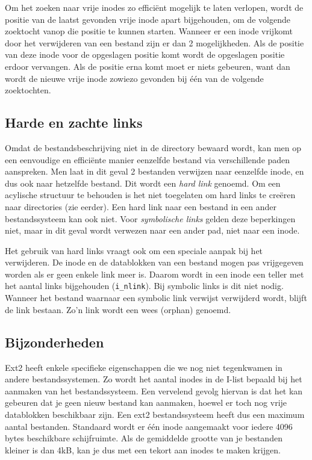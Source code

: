 Om het zoeken naar vrije inodes zo effici\"ent mogelijk te laten verlopen, wordt de positie van de laatst gevonden
vrije inode apart bijgehouden, om de volgende zoektocht vanop die positie te kunnen starten. Wanneer er een inode
vrijkomt door het verwijderen van een bestand zijn er dan 2 mogelijkheden. Als de positie van deze inode voor de
opgeslagen positie komt wordt de opgeslagen positie erdoor vervangen. Als de positie erna komt moet er niets gebeuren,
want dan wordt de nieuwe vrije inode zowiezo gevonden bij \'e\'en van de volgende zoektochten.

\subsection{Harde en zachte links}

Omdat de bestandsbeschrijving niet in de directory bewaard wordt, kan men op een eenvoudige en effici\"ente
manier eenzelfde bestand via verschillende paden aanspreken. Men laat in dit geval 2 bestanden verwijzen
naar eenzelfde inode, en dus ook naar hetzelfde bestand. Dit wordt een \emph{hard link} genoemd. Om een
acylische structuur te behouden is het niet toegelaten om hard links te cre\"eren naar directories
(zie eerder). Een hard link naar een bestand in een ander bestandssysteem kan ook niet. Voor
\emph{symbolische links} gelden deze beperkingen niet, maar in dit geval wordt verwezen naar een ander pad,
niet naar een inode.

Het gebruik van hard links vraagt ook om een speciale aanpak bij het verwijderen. De inode en de datablokken van
een bestand mogen pas vrijgegeven worden als er geen enkele link meer is. Daarom wordt in een inode een teller
met het aantal links bijgehouden (\verb|i_nlink|). Bij symbolic links is dit niet nodig. Wanneer het bestand
waarnaar een symbolic link verwijst verwijderd wordt, blijft de link bestaan. Zo'n link wordt een wees (orphan)
genoemd.

\subsection{Bijzonderheden}

Ext2 heeft enkele specifieke eigenschappen die we nog niet tegenkwamen in andere bestandssystemen. Zo wordt
het aantal inodes in de I-list bepaald bij het aanmaken van het bestandssysteem. Een vervelend
gevolg hiervan is dat het kan gebeuren dat je geen nieuw bestand kan aanmaken, hoewel er toch nog vrije
datablokken beschikbaar zijn. Een ext2 bestandssysteem heeft dus een maximum aantal bestanden. Standaard
wordt er \'e\'en inode aangemaakt voor iedere 4096 bytes beschikbare schijfruimte. Als de gemiddelde grootte
van je bestanden kleiner is dan 4kB, kan je dus met een tekort aan inodes te maken krijgen.

